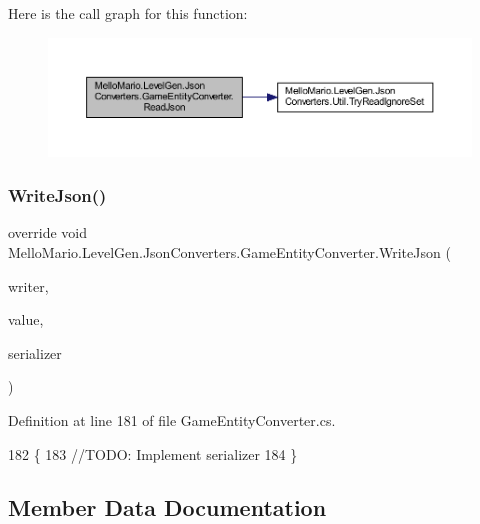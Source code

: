 Here is the call graph for this function\+:
\nopagebreak
\begin{figure}[H]
\begin{center}
\leavevmode
\includegraphics[width=350pt]{classMelloMario_1_1LevelGen_1_1JsonConverters_1_1GameEntityConverter_a5dfe209b59617d72f476fb940a7c9e79_cgraph}
\end{center}
\end{figure}
\mbox{\label{classMelloMario_1_1LevelGen_1_1JsonConverters_1_1GameEntityConverter_a8d1006a730aa322d0f449a88389cbc03}} 
\subsubsection{Write\+Json()}
{\footnotesize\ttfamily override void Mello\+Mario.\+Level\+Gen.\+Json\+Converters.\+Game\+Entity\+Converter.\+Write\+Json (\begin{DoxyParamCaption}\item[{Json\+Writer}]{writer,  }\item[{object}]{value,  }\item[{Json\+Serializer}]{serializer }\end{DoxyParamCaption})}



Definition at line 181 of file Game\+Entity\+Converter.\+cs.


\begin{DoxyCode}
182         \{
183             \textcolor{comment}{//TODO: Implement serializer}
184         \}
\end{DoxyCode}


\subsection{Member Data Documentation}
\mbox{\label{classMelloMario_1_1LevelGen_1_1JsonConverters_1_1GameEntityConverter_abc7ab455925cfbf7c1896fe1f6c33ed9}} 
